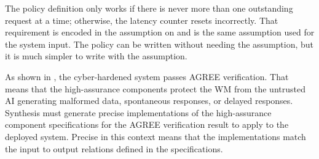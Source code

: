 The policy definition only works if there is never more than one
outstanding request at a time; otherwise, the latency counter resets
incorrectly.  That requirement is encoded in the assumption on
 and is the same assumption used for the
system input.  The policy can be written without needing the
assumption, but it is much simpler to write with the assumption.

As shown in , the cyber-hardened
system passes AGREE verification.  That means that the high-assurance
components protect the WM from the untrusted AI generating malformed
data, spontaneous responses, or delayed responses.  Synthesis must
generate precise implementations of the high-assurance component
specifications for the AGREE verification result to apply to the
deployed system.  Precise in this context means that the
implementations match the input to output relations defined in the
specifications.
